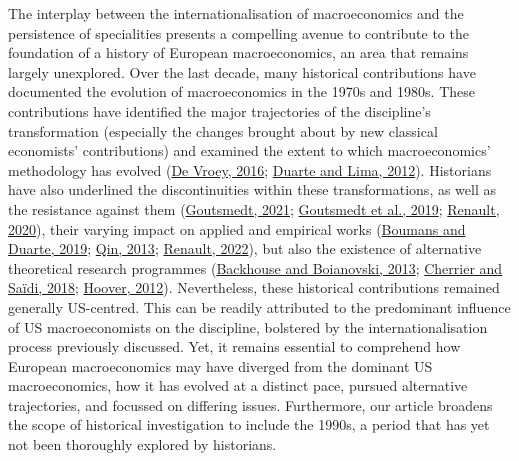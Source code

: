 \documentclass[
  12pt,
  onecolumn]{article}
\begin{document}
The interplay between the internationalisation of macroeconomics and the
persistence of specialities presents a compelling avenue to contribute
to the foundation of a history of European macroeconomics, an area that
remains largely unexplored. Over the last decade, many historical
contributions have documented the evolution of macroeconomics in the
1970s and 1980s. These contributions have identified the major
trajectories of the discipline's transformation (especially the changes
brought about by new classical economists' contributions) and examined
the extent to which macroeconomics' methodology has evolved
(\protect\hyperlink{ref-devroey2016}{De Vroey, 2016};
\protect\hyperlink{ref-duartelima2012a}{Duarte and Lima, 2012}).
Historians have also underlined the discontinuities within these
transformations, as well as the resistance against them
(\protect\hyperlink{ref-goutsmedt2021b}{Goutsmedt, 2021};
\protect\hyperlink{ref-goutsmedtetal2019}{Goutsmedt et al., 2019};
\protect\hyperlink{ref-renault2020a}{Renault, 2020}), their varying
impact on applied and empirical works
(\protect\hyperlink{ref-boumans2019}{Boumans and Duarte, 2019};
\protect\hyperlink{ref-qin2013a}{Qin, 2013};
\protect\hyperlink{ref-renault2022}{Renault, 2022}), but also the
existence of alternative theoretical research programmes
(\protect\hyperlink{ref-backhouseboianovski2013}{Backhouse and
Boianovski, 2013}; \protect\hyperlink{ref-cherrier2018c}{Cherrier and
Saïdi, 2018}; \protect\hyperlink{ref-hoover2012}{Hoover, 2012}).
Nevertheless, these historical contributions remained generally
US-centred. This can be readily attributed to the predominant influence
of US macroeconomists on the discipline, bolstered by the
internationalisation process previously discussed. Yet, it remains
essential to comprehend how European macroeconomics may have diverged
from the dominant US macroeconomics, how it has evolved at a distinct
pace, pursued alternative trajectories, and focussed on differing
issues. Furthermore, our article broadens the scope of historical
investigation to include the 1990s, a period that has yet not been
thoroughly explored by historians.
\end{document}
